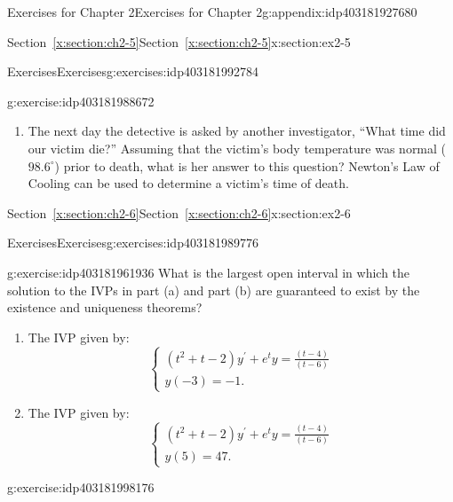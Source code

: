 \documentclass[oneside,10pt,]{book}
\newcommand{\xreffont}{\relax}
\numberwithin{equation}{section}
\numberwithin{equation}{section}
\begin{document}
\begin{appendixptx}{Exercises for Chapter 2}{}{Exercises for Chapter 2}{}{}{g:appendix:idp403181927680}
\begin{sectionptx}{Section~{\xreffont\ref*{x:section:ch2-5}}}{}{Section~{\xreffont\ref*{x:section:ch2-5}}}{}{}{x:section:ex2-5}
\begin{exercises-subsection-numberless}{Exercises}{}{Exercises}{}{}{g:exercises:idp403181992784}
\begin{divisionexercise}{1}{}{}{g:exercise:idp403181988672}
\begin{enumerate}[label=(\alph*)]
\item{}The next day the detective is asked by another investigator, ``What time did our victim die?'' Assuming that the victim's body temperature was normal (\(98.6^{\circ}\)) prior to death, what is her answer to this question? Newton's Law of Cooling can be used to determine a victim's time of death.%
\end{enumerate}
%
\end{divisionexercise}%
\end{exercises-subsection-numberless}
\end{sectionptx}
%
%
\typeout{************************************************}
\typeout{Section C.6 Section~{\xreffont\ref*{x:section:ch2-6}}}
\typeout{************************************************}
%
\begin{sectionptx}{Section~{\xreffont\ref*{x:section:ch2-6}}}{}{Section~{\xreffont\ref*{x:section:ch2-6}}}{}{}{x:section:ex2-6}
%
%
\typeout{************************************************}
\typeout{************************************************}
%
\begin{exercises-subsection-numberless}{Exercises}{}{Exercises}{}{}{g:exercises:idp403181989776}
\begin{divisionexercise}{1}{}{}{g:exercise:idp403181961936}%
What is the largest open interval in which the solution to the IVPs in part (a) and part (b) are guaranteed to exist by the existence and uniqueness theorems?%
\begin{enumerate}[label=(\alph*)]
\item{}The IVP given by:%
\begin{equation*}
\begin{cases}
\left(t^{2}+t-2\right)y^{\prime}+e^{t}y=\frac{\left(t-4\right)}{\left(t-6\right)}\\
y(-3)=-1.
\end{cases}
\end{equation*}
%
\item{}The IVP given by:%
\begin{equation*}
\begin{cases}
\left(t^{2}+t-2\right)y^{\prime}+e^{t}y=\frac{\left(t-4\right)}{\left(t-6\right)}\\
y(5)=47.
\end{cases}
\end{equation*}
%
\end{enumerate}
%
\end{divisionexercise}%
\begin{divisionexercise}{2}{}{}{g:exercise:idp403181998176}%

\end{divisionexercise}
\end{exercises-subsection-numberless}
\end{sectionptx}
\end{appendixptx}
\end{document}
